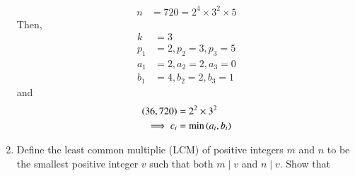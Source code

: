 \begin{enumerate}[label=\arabic*.,ref=\thesubsection.\theenumi]
\begin{align}
	n&=720 = 2^4\times 3^2 \times 5
\end{align}
Then, 
\begin{align}
	k &= 3
	\\
	p_1 &= 2, p_2 = 3, p_3 = 5
	\\
	a_1 &= 2, a_2 = 2, a_3 =0 
	\\
	b_1 &= 4, b_2 = 2, b_3 = 1
\end{align}
and 
\begin{align}
	\left(36,720\right) &= 2^2\times 3^2
	\\
	\implies c_i &= \min\left(a_i, b_i\right)
\end{align}
\item Define the least common multiplie (LCM) of positive integers $m$ and $n$ to be the smallest positive integer 
$v$ such that both $m \mid v$ and $n \mid v$.
Show that
\begin{enumerate}
\end{enumerate}
\end{enumerate}
